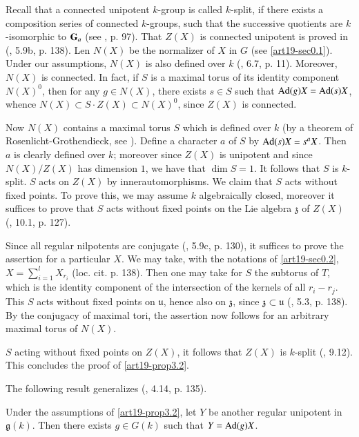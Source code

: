 Recall that a connected unipotent $k$-group is called $k$-split, if there exists a composition series of connected $k$-groups, such that the successive quotients are $k$-isomorphic to $\mathbf{G}_{a}$ (see \cite{art19-key11}, p. 97). That $Z(X)$ is connected unipotent is proved in (\cite{art19-key14}, 5.9b, p. 138). Len $N(X)$ be the normalizer of $X$ in $G$ (see \ref{art19-sec0.1}). Under our assumptions, $N(X)$ is also defined over $k$ (\cite{art19-key10}, 6.7, p. 11). Moreover, $N(X)$ is connected. In fact, if $S$ is a maximal torus of its identity component $N(X)^{0}$, then for any $g\in N(X)$, there exists $s\in S$ such that $\operatorname{\mathrm{Ad}}(g)X=\operatorname{\mathrm{Ad}}(s)X$, whence $N(X)\subset S\cdot Z(X)\subset N(X)^{0}$, since $Z(X)$ is connected.

Now $N(X)$ contains a maximal torus $S$ which is defined over $k$ (by a theorem of Rosenlicht-Grothendieck, see \cite{art19-key1}). Define a character $a$ of $S$ by $\operatorname{\mathrm{Ad}}(s)X=s^{a}X$. Then $a$ is clearly defined over $k$; moreover since $Z(X)$ is unipotent and since $N(X)/Z(X)$ has dimension $1$, we have that $\dim S=1$. It follows that $S$ is $k$-split. $S$ acts on $Z(X)$ by inner\pageoriginale automorphisms. We claim that $S$ acts without fixed points. To prove this, we may assume $k$ algebraically closed, moreover it suffices to prove that $S$ acts without fixed points on the Lie algebra $\mathfrak{z}$ of $Z(X)$ (\cite{art19-key3}, 10.1, p. 127).

Since all regular nilpotents are conjugate (\cite{art19-key14}, 5.9c, p. 130), it suffices to prove the assertion for a particular $X$. We may take, with the notations of \ref{art19-sec0.2}, $X=\sum\limits^{l}_{i=1}X_{r_{i}}$ (loc. cit. p. 138). Then one may take for $S$ the subtorus of $T$, which is the identity component of the intersection of the kernels of all $r_{i}-r_{j}$. This $S$ acts without fixed points on $\mathfrak{u}$, hence also on $\mathfrak{z}$, since $\mathfrak{z}\subset \mathfrak{u}$ (\cite{art19-key14}, 5.3, p. 138). By the conjugacy of maximal tori, the assertion now follows for an arbitrary maximal torus of $N(X)$.

$S$ acting without fixed points on $Z(X)$, it follows that $Z(X)$ is $k$-split (\cite{art19-key2}, 9.12). This concludes the proof of \ref{art19-prop3.2}.

The following result generalizes (\cite{art19-key13}, 4.14, p. 135).

\begin{corollary}\label{art19-coro3.3}
Under the assumptions of \ref{art19-prop3.2}, let $Y$ be another regular unipotent in $\mathfrak{g}(k)$. Then there exists $g\in G(k)$ such that $Y=\operatorname{\mathrm{Ad}}(g)X$.
\end{corollary}

